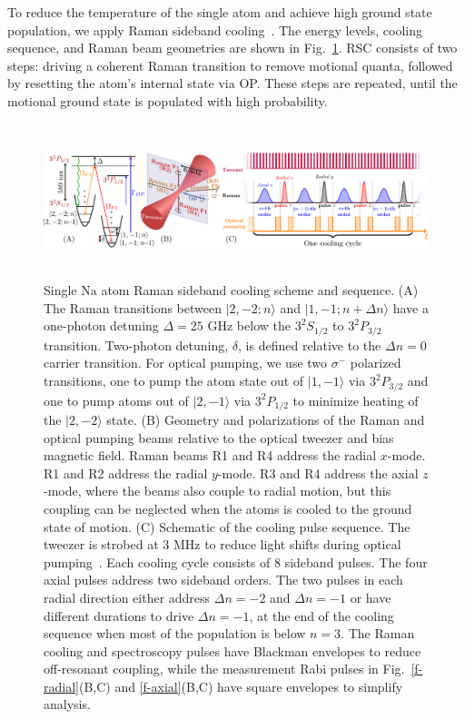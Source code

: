 \documentclass[aps,prl,twocolumn,groupedaddress]{revtex4-1}
\begin{document}
To reduce the temperature of the single atom and
 achieve high ground state population, we apply Raman sideband cooling~\cite{Monroe1995, Kaufman2012}.
The energy levels, cooling sequence, and Raman beam geometries
are shown in Fig.~\ref{f-setup}. RSC consists of two steps:
driving a coherent Raman transition to remove motional quanta, followed by resetting the atom's internal state via OP.
These steps are repeated, until the motional ground state is populated with high probability.

\begin{figure}
  \includegraphics[height=4.5cm]{fig1_combined.pdf}
  \caption{Single Na atom Raman sideband cooling scheme and sequence. (A)
    The Raman transitions between $|2,-2;n\rangle$ and $|1,-1;n+\Delta n\rangle$ have a one-photon detuning $\Delta=25$ GHz below the $3^2S_{1/2}$ to $3^2P_{3/2}$ transition. Two-photon detuning, $\delta$, is defined relative to the $\Delta n=0$ carrier transition. For optical pumping, we use two $\sigma^-$ polarized transitions, one to pump the atom state out of $|1,-1\rangle$ via $3^2P_{3/2}$ and one to pump atoms out of $|2,-1\rangle$ via $3^2P_{1/2}$
     to minimize heating of the $|2,-2\rangle$ state.
    (B) Geometry and polarizations of the Raman and optical pumping beams relative to the
    optical tweezer and bias magnetic field.  Raman beams R1 and R4 address the radial $x$-mode. R1 and R2 address the radial $y$-mode.  R3 and R4 address the axial $z$-mode, where the beams also couple to radial motion, but this coupling can be neglected when the atoms is cooled to the ground state of motion.  %
    (C) Schematic of the cooling pulse sequence. The tweezer is strobed at 3 MHz to
    reduce light shifts during optical pumping~\cite{Hutzler2017-LightShifts}.
    Each cooling cycle consists of $8$ sideband pulses.
    The four axial pulses address two sideband orders.
    The two pulses in each radial direction either address $\Delta n=-2$ and $\Delta n=-1$
    or have different durations to drive $\Delta n=-1$, at the end of the cooling sequence when most of the population is below $n=3$.
    The Raman cooling and spectroscopy pulses have Blackman envelopes to reduce off-resonant
    coupling, while the measurement Rabi pulses in Fig.~\ref{f-radial}(B,C) and \ref{f-axial}(B,C) have square envelopes to simplify analysis.
    \label{f-setup}}
\end{figure}
\end{document}

